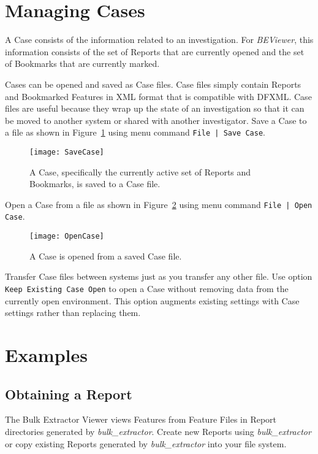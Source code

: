 \documentclass[10pt,twoside]{article}
\newcommand{\bulk}{\emph{bulk\_extractor}\xspace}
\newcommand{\bev}{\emph{BEViewer}\xspace}
\begin{document}
\section{Managing Cases}
A Case consists of the information related to an investigation.
For \bev, this information consists of the set of Reports that are currently opened
and the set of Bookmarks that are currently marked.

Cases can be opened and saved as Case files.
Case files simply contain Reports and Bookmarked Features in XML format
that is compatible with DFXML.
Case files are useful because they wrap up the state of an investigation
so that it can be moved to another system or shared with another investigator.
Save a Case to a file as shown in Figure~\ref{save-case}
using menu command \texttt{File | Save Case}.
\begin{figure}
\center
\texttt{[image: SaveCase]}
\caption{A Case, specifically the currently active set of Reports and Bookmarks,
is saved to a Case file.\label{save-case}}
\end{figure}
Open a Case from a file as shown in Figure~\ref{open-case}
using menu command \texttt{File | Open Case}.
\begin{figure}
\center
\texttt{[image: OpenCase]}
\caption{A Case is opened from a saved Case file.\label{open-case}}
\end{figure}
Transfer Case files between systems just as you transfer any other file.
Use option \texttt{Keep Existing Case Open} to open a Case
without removing data from the currently open environment.
This option augments existing settings with Case settings
rather than replacing them.

\section{Examples}
\subsection{Obtaining a Report}
The Bulk Extractor Viewer views Features
from Feature Files in Report directories generated by \bulk.
Create new Reports using \bulk
or copy existing Reports generated by \bulk into your file system.
\end{document}
